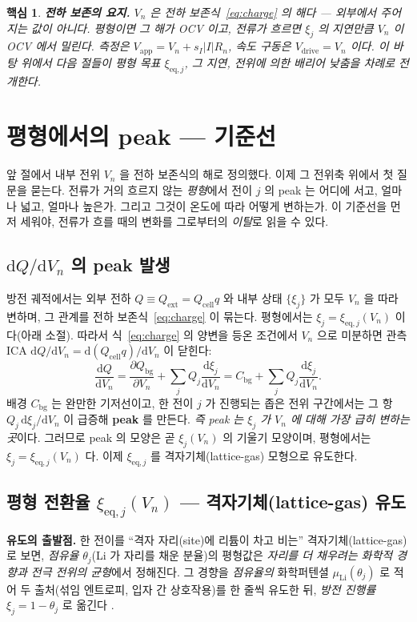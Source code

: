 \documentclass[11pt,a4paper]{article}
\newtheorem*{keybox}{핵심}
\newcommand{\dd}{\mathrm{d}}
\newcommand{\eq}{\mathrm{eq}}
\newcommand{\app}{\mathrm{app}}
\newcommand{\drive}{\mathrm{drive}}
\newcommand{\cell}{\mathrm{cell}}
\newcommand{\bg}{\mathrm{bg}}
\newcommand{\ext}{\mathrm{ext}}
\begin{document}
\begin{keybox}
\textbf{전하 보존의 요지.} $V_n$ 은 전하 보존식~\eqref{eq:charge} 의 해다 — 외부에서 주어지는 값이 아니다.
평형이면 그 해가 OCV 이고, 전류가 흐르면 $\xi_j$ 의 지연만큼 $V_n$ 이 OCV 에서 밀린다. 측정은
$V_\app=V_n+s_I|I|R_n$, 속도 구동은 $V_\drive=V_n$ 이다. 이 바탕 위에서 다음 절들이 평형 목표 $\xi_{\eq,j}$,
그 지연, 전위에 의한 배리어 낮춤을 차례로 전개한다.
\end{keybox}

\section{평형에서의 peak — 기준선}\label{sec:eqpeak}
앞 절에서 내부 전위 $V_n$ 을 전하 보존식의 해로 정의했다. 이제 그 전위축 위에서 첫 질문을 묻는다. 전류가 거의
흐르지 않는 \emph{평형}에서 전이 $j$ 의 peak 는 어디에 서고, 얼마나 넓고, 얼마나 높은가. 그리고 그것이 온도에
따라 어떻게 변하는가. 이 기준선을 먼저 세워야, 전류가 흐를 때의 변화를 그로부터의 \emph{이탈}로 읽을 수 있다.

\subsection{$\dd Q/\dd V_n$ 의 peak 발생}
방전 궤적에서는 외부 전하 $Q\equiv Q_\ext=Q_\cell q$ 와 내부 상태 $\{\xi_j\}$ 가 모두 $V_n$ 을 따라 변하며,
그 관계를 전하 보존식~\eqref{eq:charge} 이 묶는다. 평형에서는 $\xi_j=\xi_{\eq,j}(V_n)$ 이다(아래 소절). 따라서
식~\eqref{eq:charge} 의 양변을 등온 조건에서 $V_n$ 으로 미분하면 관측 ICA $\dd Q/\dd V_n=\dd(Q_\cell q)/\dd V_n$
이 닫힌다:
\begin{equation}
\frac{\dd Q}{\dd V_n}=\frac{\partial Q_\bg}{\partial V_n}+\sum_j Q_j\frac{\dd\xi_j}{\dd V_n}
=C_\bg+\sum_j Q_j\frac{\dd\xi_j}{\dd V_n}.
\label{eq:dQdV}
\end{equation}
배경 $C_\bg$ 는 완만한 기저선이고, 한 전이 $j$ 가 진행되는 좁은 전위 구간에서는 그 항 $Q_j\,\dd\xi_j/\dd V_n$ 이
급증해 \textbf{peak} 를 만든다. \emph{즉 peak 는 $\xi_j$ 가 $V_n$ 에 대해 가장 급히 변하는 곳}이다. 그러므로
peak 의 모양은 곧 $\xi_j(V_n)$ 의 기울기 모양이며, 평형에서는 $\xi_j=\xi_{\eq,j}(V_n)$ 다. 이제 $\xi_{\eq,j}$ 를
격자기체(lattice-gas) 모형으로 유도한다.

\subsection{평형 전환율 $\xi_{\eq,j}(V_n)$ — 격자기체(lattice-gas) 유도}
\textbf{유도의 출발점.} 한 전이를 ``격자 자리(site)에 리튬이 차고 비는'' 격자기체(lattice-gas)로 보면, \emph{점유율}
$\theta_j$(Li 가 자리를 채운 분율)의 평형값은 \emph{자리를 더 채우려는 화학적 경향과 전극 전위의 균형}에서 정해진다.
그 경향을 \emph{점유율의} 화학퍼텐셜 $\mu_\mathrm{Li}(\theta_j)$ 로 적어 두 출처(섞임 엔트로피, 입자 간 상호작용)를 한
줄씩 유도한 뒤, \emph{방전 진행률} $\xi_j=1-\theta_j$ 로 옮긴다 \cite{mckinnon1983,bazant2013}.
\end{document}
